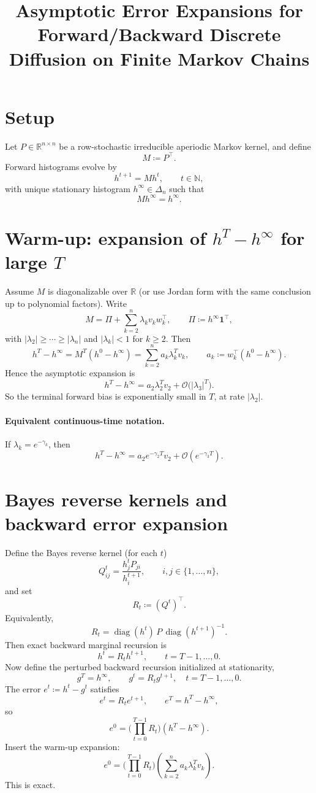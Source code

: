 \documentclass[11pt]{article}
\title{Asymptotic Error Expansions for Forward/Backward Discrete Diffusion on Finite Markov Chains}
\author{}
\date{}
\newcommand{\ones}{\mathbf{1}}
\newcommand{\diag}{\operatorname{diag}}
\begin{document}
\maketitle

\section{Setup}
Let $P\in\mathbb R^{n\times n}$ be a row-stochastic irreducible aperiodic Markov kernel, and define
\[
M\coloneqq P^\top.
\]
Forward histograms evolve by
\[
h^{t+1}=Mh^t,
\qquad t\in\mathbb N,
\]
with unique stationary histogram $h^\infty\in\Delta_n$ such that
\[
Mh^\infty=h^\infty.
\]

\section{Warm-up: expansion of $h^T-h^\infty$ for large $T$}
Assume $M$ is diagonalizable over $\mathbb R$ (or use Jordan form with the same conclusion up to polynomial factors). Write
\[
M = \Pi + \sum_{k=2}^n \lambda_k v_k w_k^\top,
\qquad
\Pi\coloneqq h^\infty \ones^\top,
\]
with $|\lambda_2|\ge\cdots\ge|\lambda_n|$ and $|\lambda_k|<1$ for $k\ge2$.
Then
\[
h^T-h^\infty
= M^T(h^0-h^\infty)
= \sum_{k=2}^n a_k\lambda_k^T v_k,
\qquad
 a_k\coloneqq w_k^\top(h^0-h^\infty).
\]
Hence the asymptotic expansion is
\[
h^T-h^\infty
= a_2\lambda_2^T v_2 + \mathcal O\big(|\lambda_3|^T\big).
\]
So the terminal forward bias is exponentially small in $T$, at rate $|\lambda_2|$.

\paragraph{Equivalent continuous-time notation.}
If $\lambda_k=e^{-\gamma_k}$, then
\[
h^T-h^\infty
= a_2e^{-\gamma_2 T}v_2+\mathcal O(e^{-\gamma_3T}).
\]

\section{Bayes reverse kernels and backward error expansion}
Define the Bayes reverse kernel (for each $t$)
\[
Q^t_{ij}=\frac{h_j^t P_{ji}}{h_i^{t+1}},
\qquad i,j\in\{1,\dots,n\},
\]
and set
\[
R_t\coloneqq (Q^t)^\top.
\]
Equivalently,
\[
R_t=\diag(h^t)\,P\,\diag(h^{t+1})^{-1}.
\]
Then exact backward marginal recursion is
\[
h^t = R_t h^{t+1},
\qquad t=T-1,\dots,0.
\]
Now define the perturbed backward recursion initialized at stationarity,
\[
g^T=h^\infty,
\qquad
g^t=R_t g^{t+1},\quad t=T-1,\dots,0.
\]
The error $e^t\coloneqq h^t-g^t$ satisfies
\[
e^t=R_t e^{t+1},
\qquad
 e^T=h^T-h^\infty,
\]
so
\[
e^0 = \Big(\prod_{t=0}^{T-1}R_t\Big)(h^T-h^\infty).
\]
Insert the warm-up expansion:
\[
e^0 = \Big(\prod_{t=0}^{T-1}R_t\Big)
\left(\sum_{k=2}^n a_k\lambda_k^T v_k\right).
\]
This is exact.
\end{document}
